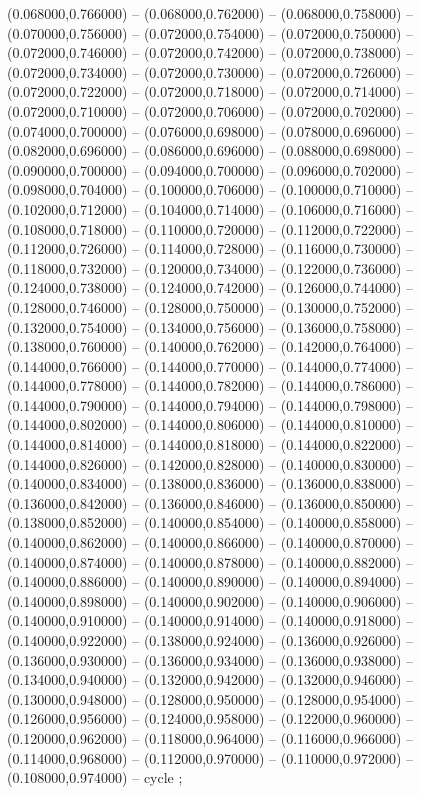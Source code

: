 (0.068000,0.766000) -- (0.068000,0.762000) -- (0.068000,0.758000) -- (0.070000,0.756000) -- (0.072000,0.754000) -- (0.072000,0.750000) -- (0.072000,0.746000) -- (0.072000,0.742000) -- (0.072000,0.738000) -- (0.072000,0.734000) -- (0.072000,0.730000) -- (0.072000,0.726000) -- (0.072000,0.722000) -- (0.072000,0.718000) -- (0.072000,0.714000) -- (0.072000,0.710000) -- (0.072000,0.706000) -- (0.072000,0.702000) -- (0.074000,0.700000) -- (0.076000,0.698000) -- (0.078000,0.696000) -- (0.082000,0.696000) -- (0.086000,0.696000) -- (0.088000,0.698000) -- (0.090000,0.700000) -- (0.094000,0.700000) -- (0.096000,0.702000) -- (0.098000,0.704000) -- (0.100000,0.706000) -- (0.100000,0.710000) -- (0.102000,0.712000) -- (0.104000,0.714000) -- (0.106000,0.716000) -- (0.108000,0.718000) -- (0.110000,0.720000) -- (0.112000,0.722000) -- (0.112000,0.726000) -- (0.114000,0.728000) -- (0.116000,0.730000) -- (0.118000,0.732000) -- (0.120000,0.734000) -- (0.122000,0.736000) -- (0.124000,0.738000) -- (0.124000,0.742000) -- (0.126000,0.744000) -- (0.128000,0.746000) -- (0.128000,0.750000) -- (0.130000,0.752000) -- (0.132000,0.754000) -- (0.134000,0.756000) -- (0.136000,0.758000) -- (0.138000,0.760000) -- (0.140000,0.762000) -- (0.142000,0.764000) -- (0.144000,0.766000) -- (0.144000,0.770000) -- (0.144000,0.774000) -- (0.144000,0.778000) -- (0.144000,0.782000) -- (0.144000,0.786000) -- (0.144000,0.790000) -- (0.144000,0.794000) -- (0.144000,0.798000) -- (0.144000,0.802000) -- (0.144000,0.806000) -- (0.144000,0.810000) -- (0.144000,0.814000) -- (0.144000,0.818000) -- (0.144000,0.822000) -- (0.144000,0.826000) -- (0.142000,0.828000) -- (0.140000,0.830000) -- (0.140000,0.834000) -- (0.138000,0.836000) -- (0.136000,0.838000) -- (0.136000,0.842000) -- (0.136000,0.846000) -- (0.136000,0.850000) -- (0.138000,0.852000) -- (0.140000,0.854000) -- (0.140000,0.858000) -- (0.140000,0.862000) -- (0.140000,0.866000) -- (0.140000,0.870000) -- (0.140000,0.874000) -- (0.140000,0.878000) -- (0.140000,0.882000) -- (0.140000,0.886000) -- (0.140000,0.890000) -- (0.140000,0.894000) -- (0.140000,0.898000) -- (0.140000,0.902000) -- (0.140000,0.906000) -- (0.140000,0.910000) -- (0.140000,0.914000) -- (0.140000,0.918000) -- (0.140000,0.922000) -- (0.138000,0.924000) -- (0.136000,0.926000) -- (0.136000,0.930000) -- (0.136000,0.934000) -- (0.136000,0.938000) -- (0.134000,0.940000) -- (0.132000,0.942000) -- (0.132000,0.946000) -- (0.130000,0.948000) -- (0.128000,0.950000) -- (0.128000,0.954000) -- (0.126000,0.956000) -- (0.124000,0.958000) -- (0.122000,0.960000) -- (0.120000,0.962000) -- (0.118000,0.964000) -- (0.116000,0.966000) -- (0.114000,0.968000) -- (0.112000,0.970000) -- (0.110000,0.972000) -- (0.108000,0.974000) -- cycle
   ;
